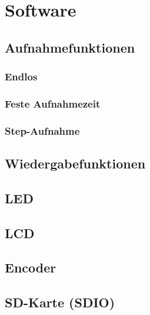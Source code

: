 
\newpage
\section{Software}



\subsection{Aufnahmefunktionen}
\subsubsection{Endlos}
\subsubsection{Feste Aufnahmezeit}
\subsubsection{Step-Aufnahme}
\subsection{Wiedergabefunktionen}
\subsection{LED}
\subsection{LCD}
\subsection{Encoder}
\subsection{SD-Karte (SDIO)}
